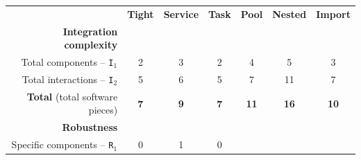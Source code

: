\documentclass[preprint,3p,twocolumn]{elsarticle}
\newcommand{\note}[2]{\pdfmargincomment[color=yellow,author=#1,open=true]{#2}}
\newcommand{\closednote}[4]{} %
\begin{document}
\closednote{Sil}{normalization is explained in caption tab 2. i wonder whether something should be said here, as questions about the range of the score immediately pops to mind..}{Tristan}{Added a sentence about it.}

\begin{table}
\footnotesize
\centering
\begin{tabular}{rcccccc}
                                     & \textbf{Tight}
                                     & \textbf{Service}
                                     & \textbf{Task}
                                     & \textbf{Pool}
                                     & \textbf{Nested}
                                     & \textbf{Import} \\
\cellcolor[HTML]{EEEEEE}\textbf{Integration complexity}& \multicolumn{6}{l}{\cellcolor[HTML]{EEEEEE}}\\
  Total components -- \texttt{I$_1$} & \cellcolor[HTML]{99FF99}2
                                     & \cellcolor[HTML]{99DD99}3
                                     & \cellcolor[HTML]{99FF99}2
                                     & \cellcolor[HTML]{99BB99}4
                                     & \cellcolor[HTML]{999999}5
                                     & \cellcolor[HTML]{99DD99}3\\
Total interactions -- \texttt{I$_2$} & \cellcolor[HTML]{99FF99}5
                                     & \cellcolor[HTML]{99EE99}6
                                     & \cellcolor[HTML]{99FF99}5
                                     & \cellcolor[HTML]{99DD99}7
                                     & \cellcolor[HTML]{999999}11
                                     & \cellcolor[HTML]{99DD99}7\\
\textbf{Total} (total software pieces) & \cellcolor[HTML]{99FF99}\textbf{7}
                                     & \cellcolor[HTML]{99E899}\textbf{9}
                                     & \cellcolor[HTML]{99FF99}\textbf{7}
                                     & \cellcolor[HTML]{99D299}\textbf{11}
                                     & \cellcolor[HTML]{999999}\textbf{16}
                                     & \cellcolor[HTML]{99DD99}\textbf{10}\\
\cellcolor[HTML]{EEEEEE}\textbf{Robustness}& \multicolumn{6}{l}{\cellcolor[HTML]{EEEEEE}}\\
Specific components -- \texttt{R$_1$} & \cellcolor[HTML]{99FF99}0
                                     & \cellcolor[HTML]{99CC99}1
                                     & \cellcolor[HTML]{99FF99}0

\end{tabular}
\end{table}
\end{document}
